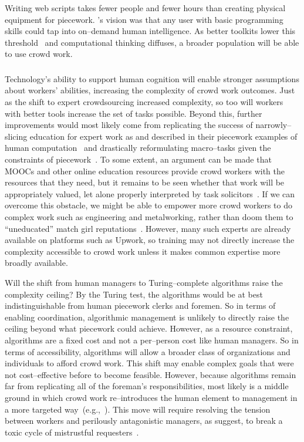 \documentclass[trackingWork]{subfiles}
\begin{document}
Writing web scripts takes fewer people and fewer hours than creating physical equipment for piecework.
\citeauthor{turkitLittle}'s vision was that any user with basic programming skills could tap into on--demand human intelligence.
As better toolkits lower this threshold~\cite{myers2000past} and computational thinking diffuses, a broader population will be able to use crowd work.

\clearpage
\subsubsection{\implication}
Technology's ability to support human cognition will enable stronger assumptions about workers' abilities, increasing the complexity of crowd work outcomes.
Just as the shift to expert crowdsourcing increased complexity, so too will workers with better tools increase the set of tasks possible.
Beyond this, further improvements would most likely come from replicating the success of narrowly--slicing education for expert work as \citeauthor{hart2013rise} and \citeauthor{grier2013computers} described in their piecework examples
of human computation~\cite{grier2013computers} and drastically reformulating macro--tasks given the constraints of piecework~\cite{hart2013rise}.
To some extent, an argument can be made that
MOOCs and other online education resources
provide crowd workers with the resources that they need, but 
it remains to be seen whether that work will be appropriately valued, let alone
properly interpreted by task solicitors~\cite{aguaded2013mooc}.
If we can overcome this obstacle,
we might be able to empower more crowd workers to do complex work such as engineering and metalworking,
rather than doom them to ``uneducated'' match girl reputations~\cite{10.2307/3827491}.
However, many such experts are already available on platforms such as Upwork, so training may not directly increase the complexity accessible to crowd work unless it makes common expertise more broadly available.

Will the shift from human managers to Turing--complete algorithms raise the complexity ceiling? 
By the Turing test, the algorithms would be at best indistinguishable from human piecework clerks and foremen.
So in terms of enabling coordination, algorithmic management is unlikely to directly raise the ceiling beyond what piecework could achieve.
However, as a resource constraint, algorithms are a fixed cost and not a per--person cost like human managers.
So in terms of accessibility, algorithms will allow a broader class of organizations and individuals to afford crowd work.
This shift may enable complex goals that were not cost--effective before to become feasible.
However, because algorithms remain far from replicating all of the foreman's responsibilities,
most likely is a middle ground in which crowd work re--introduces
the human element to management in a more targeted way~(e.g.,~\cite{haas2015argonaut,kulkarni2012mobileworks,crowdguilds}).
This move will require resolving the tension between workers and perilously antagonistic managers, as \citeauthor{10.2307/2118435} suggest, to break a toxic cycle of mistrustful requesters~\cite{MaliciousCrowdworkersGadiraju}.
\end{document}
